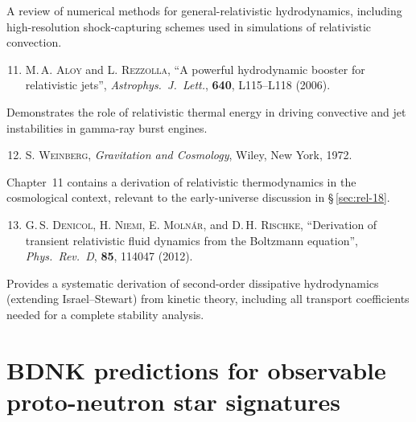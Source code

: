 \noindent A review of numerical methods for general-relativistic
hydrodynamics, including high-resolution shock-capturing schemes used
in simulations of relativistic convection.

\begin{enumerate}
\setcounter{enumi}{10}

\item \textsc{M.\,A. Aloy} and \textsc{L. Rezzolla}, ``A powerful
  hydrodynamic booster for relativistic jets'',
  \textit{Astrophys.\ J.\ Lett.}, \textbf{640}, L115--L118 (2006).

\end{enumerate}

\noindent Demonstrates the role of relativistic thermal energy in
driving convective and jet instabilities in gamma-ray burst engines.

\begin{enumerate}
\setcounter{enumi}{11}

\item \textsc{S. Weinberg}, \textit{Gravitation and Cosmology},
  Wiley, New York, 1972.

\end{enumerate}

\noindent Chapter~11 contains a derivation of relativistic
thermodynamics in the cosmological context, relevant to the
early-universe discussion in \S\,\ref{sec:rel-18}.

\begin{enumerate}
\setcounter{enumi}{12}

\item \textsc{G.\,S. Denicol}, \textsc{H. Niemi},
  \textsc{E. Moln\'ar}, and \textsc{D.\,H. Rischke},
  ``Derivation of transient relativistic fluid dynamics from the
  Boltzmann equation'',
  \textit{Phys.\ Rev.\ D}, \textbf{85}, 114047 (2012).

\end{enumerate}

\noindent Provides a systematic derivation of second-order dissipative
hydrodynamics (extending Israel--Stewart) from kinetic theory, including
all transport coefficients needed for a complete stability analysis.


\section{BDNK predictions for observable proto-neutron star signatures}
\label{sec:deep11-neutrino}

